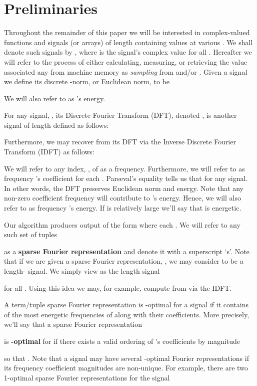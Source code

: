 \documentclass{article}
\begin{document}
\section{Preliminaries}
\label{sec:prelim}

Throughout the remainder of this paper we will be interested in complex-valued functions  and signals (or arrays) of length  containing  values at various .  We shall denote such signals by , where  is the signal's  complex value for all .  Hereafter we will refer to the process of either calculating, measuring, or retrieving the  value associated any  from machine memory as \textit{sampling} from  and/or .  Given a signal  we define 
its discrete -norm, or Euclidean norm, to be 
  
We will also refer to  as 's energy.

For any signal, , its Discrete Fourier Transform (DFT), denoted , is another signal of length  defined as follows: 

Furthermore, we may recover  from its DFT via the Inverse Discrete Fourier Transform (IDFT) as follows:

We will refer to any index, , of  as a frequency.  Furthermore, we will refer to  as frequency 's 
coefficient for each .  Parseval's equality tells us that  for any signal.  In other words, the DFT 
preserves Euclidean norm and energy.  Note that any non-zero coefficient frequency will contribute to 's energy.  Hence, we will also refer to 
 as frequency 's energy.  If  is relatively large we'll say that  is energetic.

Our algorithm produces output of the form  where each .  We will refer to any such set of  tuples 
 
as a \textbf{sparse Fourier representation} and denote it with a superscript `s'.  Note that if we are given a sparse Fourier representation, , we may consider 
to be a length- signal.  We simply view  as the  length signal

for all .  Using this idea we may, for example, compute  from  via the IDFT.

A  term/tuple sparse Fourier representation is -optimal for a signal  if it contains  of the most energetic frequencies of  along with their coefficients.  More precisely, we'll say that a sparse Fourier representation 
 
is \textbf{-optimal} for  if there exists a valid ordering of 's coefficients by magnitude

so that .  Note that a signal may have several -optimal Fourier 
representations if its frequency coefficient magnitudes are non-unique.  For example, there are two 1-optimal sparse Fourier representations for the signal 
\end{document}
